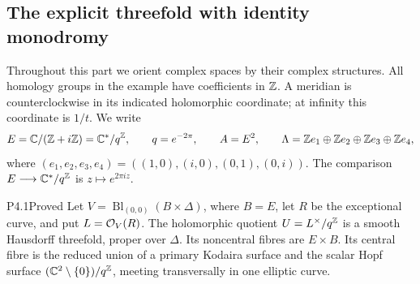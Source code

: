 \subsection{The explicit threefold with identity monodromy}

Throughout this part we orient complex spaces by their complex structures.
All homology groups in the example have coefficients in $\mathbb Z$. A meridian is
counterclockwise in its indicated holomorphic coordinate; at infinity this
coordinate is $1/t$. We write
\[
 E=\mathbb C/(\mathbb Z+i\mathbb Z)=\mathbb C^*/q^\mathbb Z,\qquad q=e^{-2\pi},\qquad
 A=E^2,\qquad \Lambda=\mathbb Z e_1\oplus\mathbb Z e_2\oplus\mathbb Z e_3\oplus\mathbb Z e_4,
\]
where $(e_1,e_2,e_3,e_4)=((1,0),(i,0),(0,1),(0,i))$. The comparison
$E\longrightarrow\mathbb C^*/q^\mathbb Z$ is $z\mapsto e^{2\pi iz}$.

\begin{statement}{P4.1}{Proved}
Let $V=\operatorname{Bl}_{(0,0)}(B\times\Delta)$, where $B=E$, let $R$ be
the exceptional curve, and put $L=\mathcal O_V(R)$. The holomorphic quotient
$U=L^\times/q^\mathbb Z$ is a smooth Hausdorff threefold, proper over $\Delta$.
Its noncentral fibres are $E\times B$. Its central fibre is the reduced
union of a primary Kodaira surface and the scalar Hopf surface
$(\mathbb C^2\setminus\{0\})/q^\mathbb Z$, meeting transversally in one elliptic curve.
\end{statement}
